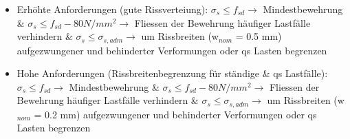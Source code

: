 \begin{minipage}{0.5\linewidth}
		\begin{itemize}
		
			\item Erhöhte Anforderungen (gute Rissverteiung): $ \sigma_s \leq f_{sd} \rightarrow $ Mindestbewehrung \& $ \sigma_s \leq f_{sd} -80 N/mm^2 \rightarrow $ Fliessen der Bewehrung häufiger Lastfälle verhindern \& $ \sigma_s \leq \sigma_{s,adm} \rightarrow $ um Rissbreiten (w$_{nom}$ = 0.5 mm) aufgezwungener und behinderter Verformungen oder qs Lasten begrenzen
		
			\item Hohe Anforderungen (Rissbreitenbegrenzung für ständige \& qs Lastfälle): $ \sigma_s \leq f_{sd} \rightarrow $ Mindestbewehrung \& $\sigma_s \leq f_{sd} - 80 N/mm^2 \rightarrow $ Fliessen der Bewehrung häufiger Lastfälle verhindern \& $ \sigma_s \leq \sigma_{s,adm} \rightarrow $ um Rissbreiten (w$_{nom}$ = 0.2 mm) aufgezwungener und behinderter Verformungen oder qs Lasten begrenzen
			
		\end{itemize}
\end{minipage}





